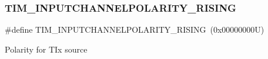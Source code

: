 \subsubsection{\texorpdfstring{T\+I\+M\+\_\+\+I\+N\+P\+U\+T\+C\+H\+A\+N\+N\+E\+L\+P\+O\+L\+A\+R\+I\+T\+Y\+\_\+\+R\+I\+S\+I\+NG}{TIM\_INPUTCHANNELPOLARITY\_RISING}}
{\footnotesize\ttfamily \#define T\+I\+M\+\_\+\+I\+N\+P\+U\+T\+C\+H\+A\+N\+N\+E\+L\+P\+O\+L\+A\+R\+I\+T\+Y\+\_\+\+R\+I\+S\+I\+NG~(0x00000000\+U)}

Polarity for T\+Ix source 